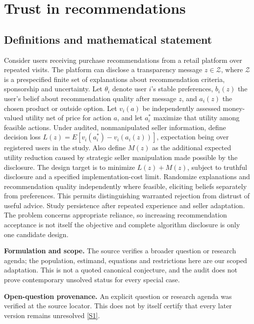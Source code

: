 \documentclass[11pt]{article}
\newcommand{\sref}[2]{\hyperlink{source:#1:#2}{[S#2]}}
\begin{document}
\section*{Trust in recommendations}\label{30007686}
\subsection{Definitions and mathematical statement}
Consider users receiving purchase recommendations from a retail platform over repeated visits. The platform can disclose a transparency message \(z\in\mathcal Z\), where \(\mathcal Z\) is a prespecified finite set of explanations about recommendation criteria, sponsorship and uncertainty. Let \(\theta_i\) denote user \(i\)'s stable preferences, \(b_i(z)\) the user's belief about recommendation quality after message \(z\), and \(a_i(z)\) the chosen product or outside option. Let \(v_i(a)\) be independently assessed money-valued utility net of price for action \(a\), and let \(a_i^*\) maximize that utility among feasible actions. Under audited, nonmanipulated seller information, define decision loss \(L(z)=E[v_i(a_i^*)-v_i(a_i(z))]\), expectation being over registered users in the study. Also define \(M(z)\) as the additional expected utility reduction caused by strategic seller manipulation made possible by the disclosure. The design target is to minimize \(L(z)+M(z)\), subject to truthful disclosure and a specified implementation-cost limit. Randomize explanations and recommendation quality independently where feasible, eliciting beliefs separately from preferences. This permits distinguishing warranted rejection from distrust of useful advice. Study persistence after repeated experience and seller adaptation. The problem concerns appropriate reliance, so increasing recommendation acceptance is not itself the objective and complete algorithm disclosure is only one candidate design.

\par\textbf{Formulation and scope.} The source verifies a broader question or research agenda; the population, estimand, equations and restrictions here are our scoped adaptation. This is not a quoted canonical conjecture, and the audit does not prove contemporary unsolved status for every special case.

\par\textbf{Open-question provenance.} An explicit question or research agenda was verified at the source locator. This does not by itself certify that every later version remains unresolved \sref{30007686}{1}.
\end{document}
